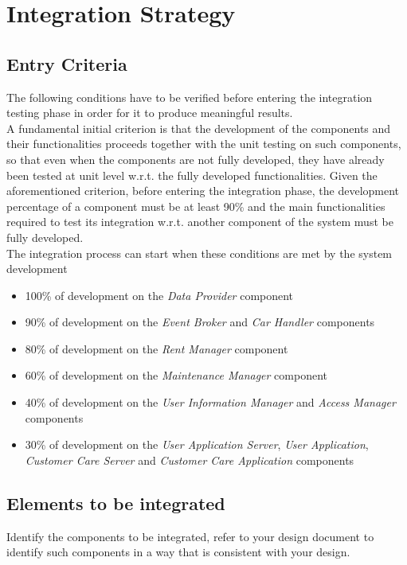 \section{Integration Strategy}

\subsection{Entry Criteria}
The following conditions have to be verified before entering the integration testing phase in order for it to produce meaningful results.\\

A fundamental initial criterion is that the development of the components and their functionalities proceeds together with the unit testing on such components, so that even when the components are not fully developed, they have already been tested at unit level w.r.t. the fully developed functionalities. 
Given the aforementioned criterion, before entering the integration phase, the development percentage of a component must be at least 90\% and the main functionalities required to test its integration w.r.t. another component of the system must be fully developed.\\

The integration process can start when these conditions are met by the system development
\begin{itemize}
	\item 100\% of development on the \emph{Data Provider} component
	\item 90\% of development on the \emph{Event Broker} and \emph{Car Handler} components
	\item 80\% of development on the \emph{Rent Manager} component
	\item 60\% of development on the \emph{Maintenance Manager} component
	\item 40\% of development on the \emph{User Information Manager} and \emph{Access Manager} components
	\item 30\% of development on the \emph{User Application Server}, \emph{User Application}, \emph{Customer Care Server} and \emph{Customer Care Application} components
\end{itemize}

\subsection{Elements to be integrated}
Identify the components to be integrated, refer to your design document to identify such components in a way that is consistent with your design.

